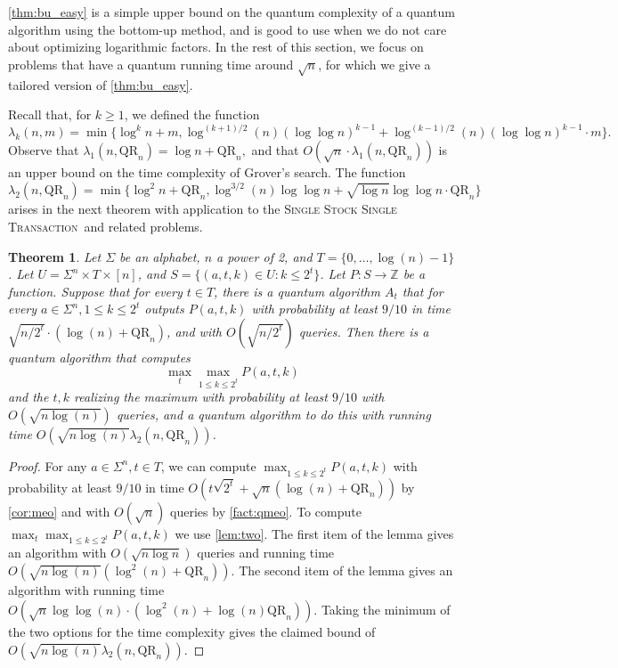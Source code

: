 \documentclass[12pt]{article}
\newcommand{\qr}{\mathrm{QR}}
\newcommand{\Z}{\mathbb{Z}}
\newcommand{\SSSTf}{\textsc{Single Stock Single Transaction}}
\newtheorem{theorem}{Theorem}
\theoremstyle{definition}
\begin{document}
\cref{thm:bu_easy} is a simple upper bound on the quantum complexity of a quantum algorithm using the bottom-up method, and is good to use when we do not care about optimizing logarithmic factors. In the rest of this section, we focus on problems that have a quantum running time around $\sqrt{n}$, for which we give a tailored version of \cref{thm:bu_easy}.

Recall that, for $k \geq 1$, we defined the function
\[
\lambda_k (n, m) = \min \{\log^k n + m, \log^{(k+1)/2} (n) (\log \log n)^{k-1} + \log^{(k-1)/2} (n) (\log \log n)^{k-1} \cdot m \}.
\]
Observe that  $\lambda_1 (n, \qr_n) =  \log n + \qr_n,$ and that $O(\sqrt{n} \cdot \lambda_1 (n, \qr_n) )$ is an upper bound on the time complexity of Grover's search.
The function 
\[
\lambda_2 (n, \qr_n) = \min \{\log^2 n + \qr_n , \log^{3/2} (n) \log \log n + \sqrt{\log n} \log \log n \cdot \qr_n \}
\]
arises in the next theorem with application to the \SSSTf \ and related problems.
\begin{theorem}
\label{thm:bu_rootn}
Let $\Sigma$ be an alphabet, $n$ a power of 2, and $T = \{0, \ldots, \log(n) - 1\}$.
Let $U = \Sigma^n \times T \times [n]$, and $S = \{(a, t, k) \in U : k \le 2^t\}$.
Let $P : S \rightarrow \Z$ be a function.  Suppose that for every $t \in T$, there is a quantum algorithm $A_t$ that for every $a \in \Sigma^n, 1 \le k \le 2^t$ outputs $P(a, t, k)$ with probability at least $9/10$ in time $\sqrt{n/2^t} \cdot (\log(n) + \qr_n)$, and with $O(\sqrt{n/2^t})$ queries.  Then there is a quantum algorithm that computes 
\[
\max_t \max_{1 \le k \le 2^t} P(a, t, k)
\]
and the $t,k$ realizing the maximum with probability at least $9/10$ with $O(\sqrt{n \log(n)})$ queries, and a quantum algorithm to do this with running time $O(\sqrt{n \log(n)} \lambda_2(n, \qr_n))$.
\end{theorem}

\begin{proof}
For any $a \in \Sigma^n, t \in T$, we can compute $\max_{1 \le k \le 2^t} P(a,t,k)$ with probability at least $9/10$ in time $O(t\sqrt{2^t} + \sqrt{n}(\log(n) + \qr_n))$ by \cref{cor:meo} and with $O(\sqrt{n})$ queries by \cref{fact:qmeo}.
To compute $\max_t \max_{1 \le k \le 2^t} P(a, t, k)$ we use \cref{lem:two}.
The first item of the lemma gives an algorithm with $O(\sqrt{n \log n})$ queries and running time $O(\sqrt{n \log(n)}(\log^2(n) + \qr_n))$. 
The second item of the lemma gives an algorithm with running time $O(\sqrt{n} \log \log(n) \cdot (\log^2(n) + \log(n) \qr_n))$. 
Taking the minimum of the two options for the time complexity gives the claimed bound of $O(\sqrt{n \log(n)} \lambda_2(n, \qr_n))$.
\end{proof}
\end{document}
